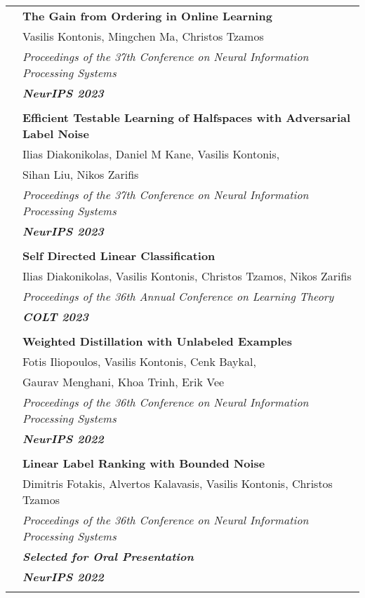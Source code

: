 \documentclass[letterpaper,11pt,oneside]{article}
\begin{document}
\begin{longtable}{@{} l l}
 &\textbf{The Gain from Ordering in Online Learning}\\
 & Vasilis Kontonis, Mingchen Ma, Christos Tzamos\\
 & \emph{Proceedings of the 37th Conference on Neural Information Processing Systems} \\
 & \emph{\textbf{NeurIPS 2023}} \\
 & \\

 &\textbf{Efficient Testable Learning of Halfspaces with Adversarial Label Noise}\\
 & Ilias Diakonikolas, Daniel M Kane, Vasilis Kontonis, \\
 & Sihan Liu, Nikos Zarifis\\
 & \emph{Proceedings of the 37th Conference on Neural Information Processing Systems} \\
 & \emph{\textbf{NeurIPS 2023}} \\
 & \\


 &\textbf{Self Directed Linear Classification}\\
 & Ilias Diakonikolas, Vasilis Kontonis, Christos Tzamos, Nikos Zarifis \\
 & \emph{Proceedings of the 36th Annual Conference on Learning Theory}\\
 & \emph{\textbf{COLT 2023}} \\
 & \\

 &\textbf{Weighted Distillation with Unlabeled Examples}\\
 & Fotis Iliopoulos, Vasilis Kontonis, Cenk Baykal,\\
 & Gaurav Menghani, Khoa Trinh, Erik Vee\\ 
& \emph{Proceedings of the 36th Conference on Neural Information Processing Systems} \\
& \emph{\textbf{NeurIPS 2022}} \\
 & \\

 &\textbf{Linear Label Ranking with Bounded Noise}\\
 &  Dimitris Fotakis, Alvertos Kalavasis, Vasilis Kontonis, Christos Tzamos \\
& \emph{Proceedings of the 36th Conference on Neural Information Processing Systems} \\
& \emph{\textbf{Selected for Oral Presentation}} \\
& \emph{\textbf{NeurIPS 2022}} \\
 & \\


\end{longtable}
\end{document}
